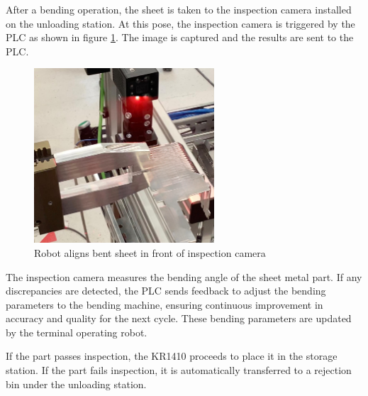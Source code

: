 
After a bending operation, the sheet is taken to the inspection camera installed on the unloading station.
At this pose, the inspection camera is triggered by the PLC as shown in figure \ref{fig:inspection-setup}. The image is captured and the results are sent to the PLC.

\begin{figure}[h]
    \centering
    \includegraphics[width=0.6\textwidth]{figures/inspection-setup.png}
    \caption{Robot aligns bent sheet in front of inspection camera}
    \label{fig:inspection-setup}
\end{figure}

The inspection camera measures the bending angle of the sheet metal part. If any discrepancies are detected, the PLC sends feedback to adjust the bending parameters to the bending machine, ensuring continuous improvement in accuracy and quality for the next cycle. These bending parameters are updated by the terminal operating robot.

If the part passes inspection, the KR1410 proceeds to place it in the storage station. If the part fails inspection, it is automatically transferred to a rejection bin under the unloading station.